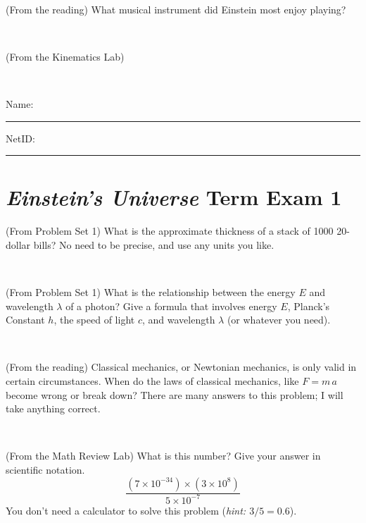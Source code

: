\documentclass[12pt, letterpaper]{article}
\begin{document}
\vfill ~

\begin{problem} (From the reading)
What musical instrument did Einstein most enjoy playing?
\end{problem}


\vfill ~

\begin{problem} (From the Kinematics Lab)

\end{problem}


\vfill ~


\cleardoublepage



\noindent
Name: \rule[-1ex]{0.60\textwidth}{0.1pt}
NetID: \rule[-1ex]{0.20\textwidth}{0.1pt}

\section*{\textsl{Einstein's Universe} Term Exam 1}
\setcounter{problem}{1}


\begin{problem} (From Problem Set 1)
What is the approximate thickness of a stack of 1000 20-dollar bills?
No need to be precise, and use any units you like.
\end{problem}


\vfill ~

\begin{problem} (From Problem Set 1)
What is the relationship between the energy $E$ and wavelength
$\lambda$ of a photon? Give a formula that involves energy $E$,
Planck's Constant $h$, the speed of light $c$, and wavelength
$\lambda$ (or whatever you need).
\end{problem}

\vfill ~

\begin{problem} (From the reading)
Classical mechanics, or Newtonian mechanics, is only valid in certain
circumstances. When do the laws of classical mechanics, like $F =
m\,a$ become wrong or break down? There are many answers to this
problem; I will take anything correct.
\end{problem}


\vfill ~

\begin{problem} (From the Math Review Lab)
What is this number? Give your answer in scientific notation.
$$
\frac{(7\times10^{-34})\times(3\times10^8)}{5\times10^{-7}}
$$
You don't need a calculator to solve this problem (\textit{hint: $3/5=0.6$}).
\end{problem}
\end{document}
